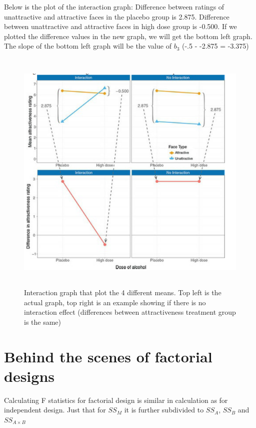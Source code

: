 Below is the plot of the interaction graph:
Difference between ratings of unattractive and attractive faces in the placebo group is 2.875. Difference between unattractive and attractive faces in high dose group is -0.500. If we plotted the difference values in the new graph, we will get the bottom left graph. The slope of the bottom left graph will be the value of $b_3$ (-.5 - -2.875 = -3.375)
\begin{figure}[h]
	\includegraphics[width=1\textwidth,height=120mm]{Chapter 14 GLM 3 Factorial Designs/interactiongraph.PNG}
	\caption{Interaction graph that plot the 4 different means. Top left is the actual graph, top right is an example showing if there is no interaction effect (differences between attractiveness treatment group is the same)}
\end{figure}

\clearpage
\section{Behind the scenes of factorial designs}
Calculating F statistics for factorial design is similar in calculation as for independent design. Just that for $SS_M$ it is further subdivided to $SS_A$, $SS_B$ and $SS_{A\times B}$

